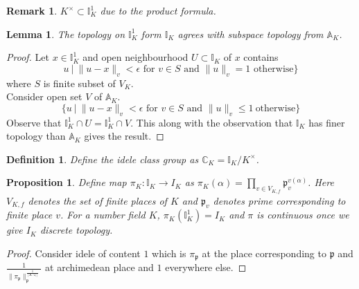 \documentclass[twoside, 12pt]{iiser-thesis}
\newtheorem{prop}[thm]{ Proposition}
\newtheorem{lem}[thm]{ Lemma}
\newtheorem{rem}{Remark}[section]
\newtheorem{defi}{ Definition}[section]
\newcommand{\C}{\mathbb{C}}
\newcommand{\Q}{\mathbb{Q}}
\newcommand{\A}{\mathbb{A}}
\newcommand{\I}{\mathbb{I}}
\newcommand{\x}{\times}
\begin{document}
\begin{rem}
$K^\x \subset \I _K ^1$ due to the product formula.
\end{rem}
\begin{lem}
The topology on $\I ^1 _K$ form $\I _K$ agrees with subspace topology from $\A _K$.
\end{lem}
\begin{proof}
Let $x \in \I ^1 _K $ and open neighbourhood $U \subset \I _K$ of $x$ contains \[ u \ | \ \|u-x\|_v < \epsilon \text{ for } v\in S \text{ and } \| u \|_v=1 \text{ otherwise} \}\]
where $S$ is finite subset of $V_K$. \\
Consider open set $V$ of $\A _K$. \[ \{ u \ | \ \|u-x\|_v < \epsilon \text{ for } v\in S \text{ and } \| u \| _v \leq 1 \ \text{otherwise} \} \]
Observe that $\I ^1 _K \cap U = \I^1 _K \cap V$. This along with the observation that $\I  _K$ has finer topology than $\A _K$ gives the result.
\end{proof}
\begin{defi}
Define the idele class group as $\C_K = \I _K/K^\x$.
\end{defi}
\begin{prop}
Define map $\pi _K : \I _K \rightarrow I_K$ as $\pi _K (\alpha) = \prod _{v \in V_{K,f}} \mathfrak p _v ^{v(\alpha )}$. Here $V_{K,f}$ denotes the set of finite places of $K$ and $\mathfrak p _v$ denotes prime corresponding to finite place $v$. For a number field $K$, $\pi _K( \I^1 _K) = I_K$ and $\pi $ is continuous once we give $I_K$ discrete topology. 
\end{prop}
\begin{proof}
Consider idele of content $1$ which is $\pi _\mathfrak p$ at the place corresponding to $\mathfrak p$ and $\frac{1}{\|\pi _\mathfrak p \|_{\mathfrak p}^{\frac{1}{[K:\Q ]}}}$ at archimedean place and $1$ everywhere else.
\end{proof}
\end{document}
